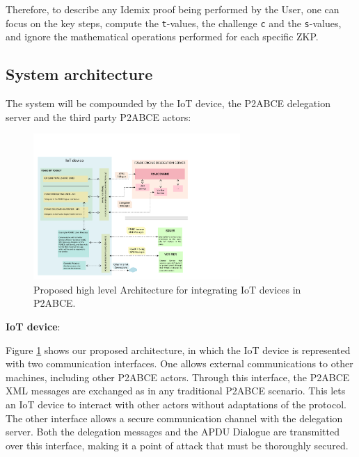 Therefore, to describe any Idemix proof being performed by the User, one can focus on the key steps, compute the \texttt{t}-values, the challenge \texttt{c} and the \texttt{s}-values, and ignore the mathematical operations performed for each specific ZKP.



\subsection{System architecture}

The system will be compounded by the IoT device, the P2ABCE delegation server and the third party P2ABCE actors:

\begin{figure}[htb!]
	\centering
	\includegraphics[width=0.7\textwidth]{gfx/P2ABCE-IoT-color}
	\caption{Proposed high level Architecture for integrating IoT devices in P2ABCE.}
	\label{fig:P2ABCE-IoT}
\end{figure}



\begin{flushleft}
	\textbf{IoT device}:
\end{flushleft}
	
	Figure \ref{fig:P2ABCE-IoT} shows our proposed architecture, in which the IoT device is represented with two communication interfaces. One allows external communications to other machines, including other P2ABCE actors. Through this interface, the P2ABCE XML messages are exchanged as in any traditional P2ABCE scenario. This lets an IoT device to interact with other actors without adaptations of the protocol. The other interface allows a secure communication channel with the delegation server. Both the delegation messages and the APDU Dialogue are transmitted over this interface, making it a point of attack that must be thoroughly secured.
	
